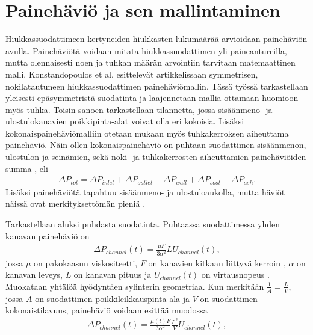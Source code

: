 \section{Painehäviö ja sen mallintaminen}
Hiukkassuodattimeen kertyneiden hiukkasten lukumäärää arvioidaan painehäviön avulla. Painehäviötä voidaan mitata hiukkassuodattimen yli paineantureilla, mutta olennaisesti noen ja tuhkan määrän arvointiin tarvitaan matemaattinen malli.
Konstandopoulos et al. esittelevät artikkelissaan \cite{Konstandopoulos2000} symmetrisen, nokilatautuneen hiukkassuodattimen painehäviömallin. Tässä työssä tarkastellaan yleisesti epäsymmetristä suodatinta ja laajennetaan mallia ottamaan huomioon myös tuhka. Toisin sanoen tarkastellaan tilannetta, jossa sisäänmeno- ja ulostulokanavien poikkipinta-alat voivat olla eri kokoisia. Lisäksi kokonaispainehäviömalliin otetaan mukaan myös tuhkakerroksen aiheuttama painehäviö. Näin ollen kokonaispainehäviö on puhtaan suodattimen sisäänmenon, ulostulon ja seinämien, sekä noki- ja tuhkakerrosten aiheuttamien painehäviöiden summa \cite{Konstandopoulos2000}\cite{Konstandopoulos2008}, eli
\begin{align}
    \Delta P_{tot} = \Delta P_{inlet} +  \Delta P_{outlet} + \Delta P_{wall} + \Delta P_{soot} +  \Delta P_{ash}.
\end{align}
Lisäksi painehäviötä tapahtuu sisäänmeno- ja ulostuloaukolla, mutta häviöt näissä ovat merkityksettömän pieniä \cite{Konstandopoulos2000}.

Tarkastellaan aluksi puhdasta suodatinta. Puhtaassa suodattimessa yhden kanavan painehäviö on
\begin{align}
    \Delta P_{channel}(t) = \frac{\mu F}{3 \alpha^2} LU_{channel}(t),
\end{align}
jossa \(\mu \) on pakokaasun viskositeetti, \(F\) on kanavien kitkaan liittyvä kerroin \cite{dieselnet_wall_flow_monolith}, \(\alpha\) on kanavan leveys, \(L\) on kanavan pituus ja \(U_{channel}(t)\) on virtausnopeus \cite{Konstandopoulos2000}.
Muokataan yhtälöä hyödyntäen sylinterin geometriaa. Kun merkitään \(\frac{1}{A} = \frac{L}{V}\), jossa \(A\) on suodattimen poikkileikkauspinta-ala ja \(V\) on suodattimen kokonaistilavuus, painehäviö voidaan esittää muodossa
\begin{align}\label{eq:clean_channel_pd}
    \Delta P_{channel}(t) = \frac{\mu(t) F}{3 \alpha^2} \frac{L^2}{V}U_{channel}(t),
\end{align}

